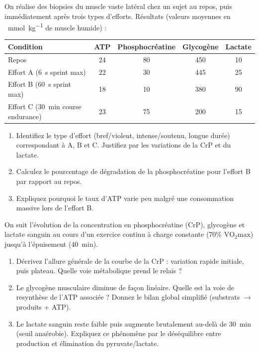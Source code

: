 \documentclass[11pt]{article}
\begin{document}
\begin{exercice}
On réalise des biopsies du muscle vaste latéral chez un sujet au repos, puis immédiatement après trois types d'efforts. Résultats (valeurs moyennes en \SI{}{\milli\mole\per\kilo\gram} de muscle humide) :

\begin{tabular}{|l|c|c|c|c|}
    \hline
    \textbf{Condition} & \textbf{ATP} & \textbf{Phosphocréatine} & \textbf{Glycogène} & \textbf{Lactate} \\
    \hline
    Repos & 24 & 80 & 450 & 10 \\
    \hline
    Effort A (\SI{6}{\second} sprint max) & 22 & 30 & 445 & 25 \\
    \hline
    Effort B (\SI{60}{\second} sprint max) & 18 & 10 & 380 & 90 \\
    \hline
    Effort C (\SI{30}{\minute} course endurance) & 23 & 75 & 200 & 15 \\
    \hline
\end{tabular}
\begin{enumerate}
    \item Identifiez le type d'effort (bref/violent, intense/soutenu, longue durée) correspondant à A, B et C. Justifiez par les variations de la CrP et du lactate.
    \item Calculez le pourcentage de dégradation de la phosphocréatine pour l'effort B par rapport au repos.
    \item Expliquez pourquoi le taux d'ATP varie peu malgré une consommation massive lors de l'effort B.
\end{enumerate}
\end{exercice}

\begin{exercice}
On suit l'évolution de la concentration en phosphocréatine (CrP), glycogène et lactate sanguin au cours d'un exercice continu à charge constante (70\% $\text{VO}_2\text{max}$) jusqu'à l'épuisement (\SI{40}{\minute}).

\begin{enumerate}
    \item Décrivez l'allure générale de la courbe de la CrP : variation rapide initiale, puis plateau. Quelle voie métabolique prend le relais ?
    \item Le glycogène musculaire diminue de façon linéaire. Quelle est la voie de resynthèse de l'ATP associée ? Donnez le bilan global simplifié (substrats $\to$ produits + ATP).
    \item Le lactate sanguin reste faible puis augmente brutalement au-delà de \SI{30}{\minute} (seuil anaérobie). Expliquez ce phénomène par le déséquilibre entre production et élimination du pyruvate/lactate.
\end{enumerate}
\end{exercice}
\end{document}
